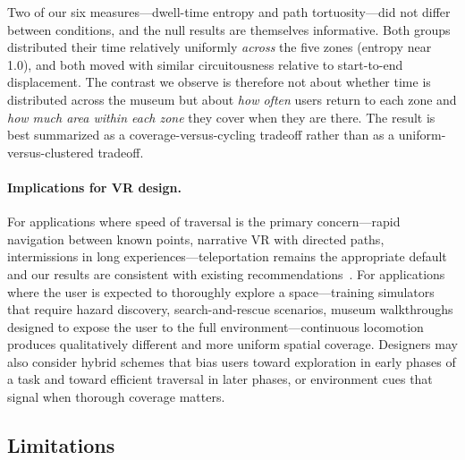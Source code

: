 \documentclass{vgtc}
\begin{document}
Two of our six measures---dwell-time entropy and path tortuosity---did not differ between conditions, and the null results are themselves informative. Both groups distributed their time relatively uniformly \emph{across} the five zones (entropy near 1.0), and both moved with similar circuitousness relative to start-to-end displacement. The contrast we observe is therefore not about whether time is distributed across the museum but about \emph{how often} users return to each zone and \emph{how much area within each zone} they cover when they are there. The result is best summarized as a coverage-versus-cycling tradeoff rather than as a uniform-versus-clustered tradeoff.

\paragraph{Implications for VR design.}
For applications where speed of traversal is the primary concern---rapid navigation between known points, narrative VR with directed paths, intermissions in long experiences---teleportation remains the appropriate default and our results are consistent with existing recommendations~\cite{Bozgeyikli:2016:PTL}. For applications where the user is expected to thoroughly explore a space---training simulators that require hazard discovery, search-and-rescue scenarios, museum walkthroughs designed to expose the user to the full environment---continuous locomotion produces qualitatively different and more uniform spatial coverage. Designers may also consider hybrid schemes that bias users toward exploration in early phases of a task and toward efficient traversal in later phases, or environment cues that signal when thorough coverage matters.

\subsection{Limitations}
\label{sec:limitations}
\end{document}
